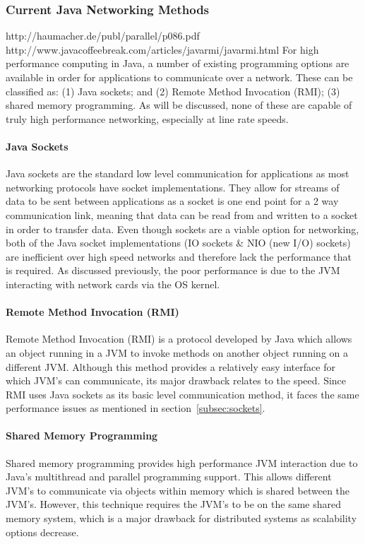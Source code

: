 \documentclass[final_report.tex]{subfiles}
\begin{document}
\subsubsection{Current Java Networking Methods}
http://haumacher.de/publ/parallel/p086.pdf
http://www.javacoffeebreak.com/articles/javarmi/javarmi.html
For high performance computing in Java, a number of existing programming options are available in order for applications to communicate over a network. These can be classified as: (1) Java sockets; and (2) Remote Method Invocation (RMI); (3) shared memory programming. As will be discussed, none of these are capable of truly high performance networking, especially at line rate speeds.

\paragraph*{Java Sockets}
Java sockets are the standard low level communication for applications as most networking protocols have socket implementations. They allow for streams of data to be sent between applications as a socket is one end point for a 2 way communication link, meaning that data can be read from and written to a socket in order to transfer data. Even though sockets are a viable option for networking, both of the Java socket implementations (IO sockets \& NIO (new I/O) sockets) are inefficient over high speed networks \cite{sockets} and therefore lack the performance that is required. As discussed previously, the poor performance is due to the JVM interacting with network cards via the OS kernel.

\paragraph*{Remote Method Invocation (RMI)}
Remote Method Invocation (RMI) is a protocol developed by Java which allows an object running in a JVM to invoke methods on another object running on a different JVM. Although this method provides a relatively easy interface for which JVM's can communicate, its major drawback relates to the speed. Since RMI uses Java sockets as its basic level communication method, it faces the same performance issues as mentioned in section~\ref{subsec:sockets}.

\paragraph*{Shared Memory Programming}
Shared memory programming provides high performance JVM interaction due to Java's multithread and parallel programming support. This allows different JVM's to communicate via objects within memory which is shared between the JVM's. However, this technique requires the JVM's to be on the same shared memory system, which is a major drawback for distributed systems as scalability options decrease.
\end{document}
